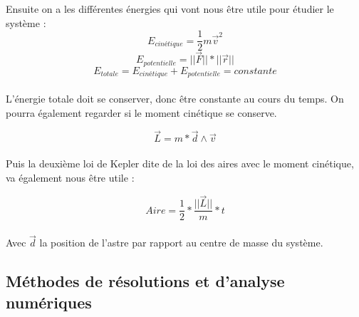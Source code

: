 \documentclass[11pt]{article}
\begin{document}
Ensuite on a les différentes énergies qui vont nous être utile pour étudier le système :
\\[2 mm]
\begin{equation}
E_{cinétique} ={\frac{1}{2}{m}}{\overrightarrow{v}^2}
\end{equation}
\begin{equation}
E_{potentielle} ={||\overrightarrow{F}||}*{||\overrightarrow{r}||}
\end{equation}
\begin{equation}
E_{totale} = E_{cinétique} + E_{potentielle} = constante
\end{equation}
\\[2 mm]
L'énergie totale doit se conserver, donc être constante au cours du temps. On pourra également regarder si le moment cinétique se conserve.

\begin{equation}
{\overrightarrow{L}= m*\overrightarrow{d}}\wedge{\overrightarrow{v}}
\end{equation}
\\[2 mm]
Puis la deuxième loi de Kepler dite de la loi des aires avec le moment cinétique, va également nous être utile :

\begin{equation}
Aire =\frac{1}{2}*\frac{||\overrightarrow{L}||}{m}*t
\end{equation}
\\[2 mm]
Avec \(\overrightarrow{d}\) la position de l'astre par rapport au centre de masse du système.

\subsection{Méthodes de résolutions et d'analyse numériques}
\end{document}
